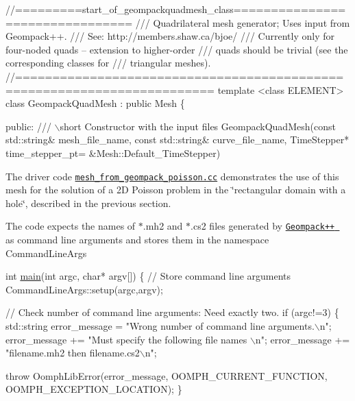  
\begin{DoxyCodeInclude}
\textcolor{comment}{//=========start\_of\_geompackquadmesh\_class================================}
\textcolor{comment}{/// Quadrilateral mesh generator; Uses input from Geompack++.}
\textcolor{comment}{}\textcolor{comment}{/// See: http://members.shaw.ca/bjoe/}
\textcolor{comment}{}\textcolor{comment}{/// Currently only for four-noded quads -- extension to higher-order}
\textcolor{comment}{}\textcolor{comment}{/// quads should be trivial (see the corresponding classes for}
\textcolor{comment}{}\textcolor{comment}{/// triangular meshes).}
\textcolor{comment}{}\textcolor{comment}{//========================================================================}
\textcolor{keyword}{template} <\textcolor{keyword}{class} ELEMENT>
\textcolor{keyword}{class }GeompackQuadMesh : \textcolor{keyword}{public} Mesh
\{

\textcolor{keyword}{public}:
\textcolor{comment}{}
\textcolor{comment}{ /// \(\backslash\)short Constructor with the input files}
\textcolor{comment}{} GeompackQuadMesh(\textcolor{keyword}{const} std::string& mesh\_file\_name,
                  \textcolor{keyword}{const} std::string& curve\_file\_name,
                  TimeStepper* time\_stepper\_pt=
                  &Mesh::Default\_TimeStepper)

\end{DoxyCodeInclude}


The driver code \href{../../../../demo_drivers/meshing/mesh_from_geompack/mesh_from_geompack_poisson.cc}{\tt mesh\+\_\+from\+\_\+geompack\+\_\+poisson.\+cc} demonstrates the use of this mesh for the solution of a 2D Poisson problem in the \char`\"{}rectangular domain with a hole\char`\"{}, described in the previous section.

The code expects the names of {\ttfamily $\ast$}.{\ttfamily mh2} and $\ast$.{\ttfamily cs2} files generated by \href{http://members.shaw.ca/bjoe/}{\tt {\ttfamily Geompack++} } as command line arguments and stores them in the namespace {\ttfamily Command\+Line\+Args} 

 
\begin{DoxyCodeInclude}
\textcolor{keywordtype}{int} \hyperlink{convert__geom__file_8cc_a0ddf1224851353fc92bfbff6f499fa97}{main}(\textcolor{keywordtype}{int} argc, \textcolor{keywordtype}{char}* argv[])
\{
\textcolor{comment}{// Store command line arguments}
 CommandLineArgs::setup(argc,argv);

 \textcolor{comment}{// Check number of command line arguments: Need exactly two.}
 \textcolor{keywordflow}{if} (argc!=3)
  \{
   std::string error\_message =
    \textcolor{stringliteral}{"Wrong number of command line arguments.\(\backslash\)n"};
   error\_message +=
    \textcolor{stringliteral}{"Must specify the following file names  \(\backslash\)n"};
   error\_message += 
    \textcolor{stringliteral}{"filename.mh2 then filename.cs2\(\backslash\)n"};

   \textcolor{keywordflow}{throw} OomphLibError(error\_message,
                       OOMPH\_CURRENT\_FUNCTION,
                       OOMPH\_EXCEPTION\_LOCATION);
  \}

\end{DoxyCodeInclude}


